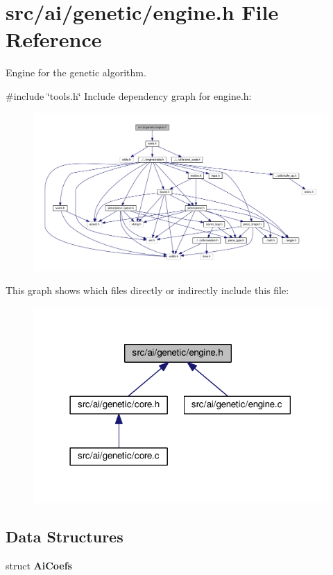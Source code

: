 \section{src/ai/genetic/engine.h File Reference}
\label{engine_8h}


Engine for the genetic algorithm.  


{\ttfamily \#include \char`\"{}tools.\+h\char`\"{}}\newline
Include dependency graph for engine.\+h\+:
\nopagebreak
\begin{figure}[H]
\begin{center}
\leavevmode
\includegraphics[width=350pt]{engine_8h__incl}
\end{center}
\end{figure}
This graph shows which files directly or indirectly include this file\+:
\nopagebreak
\begin{figure}[H]
\begin{center}
\leavevmode
\includegraphics[width=318pt]{engine_8h__dep__incl}
\end{center}
\end{figure}
\subsection*{Data Structures}
\begin{DoxyCompactItemize}
\item 
struct \textbf{ Ai\+Coefs}
\end{DoxyCompactItemize}
